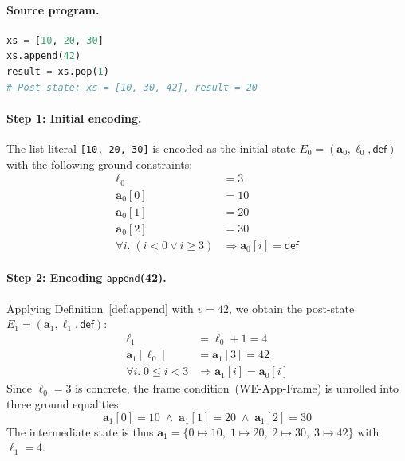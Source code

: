 \documentclass[11pt]{article}
\newcommand{\arrvar}[1]{\mathbf{a}_{#1}}
\newcommand{\lenvar}[1]{\ell_{#1}}
\newcommand{\defval}{\mathsf{def}}
\newcommand{\idx}{i}
\newcommand{\MutApp}{\ensuremath{\mathsf{append}}}
\begin{document}
\paragraph{Source program.}
\begin{lstlisting}[language=Python, caption={Source program for the worked example: append followed by pop.}]
xs = [10, 20, 30]
xs.append(42)
result = xs.pop(1)
# Post-state: xs = [10, 30, 42], result = 20
\end{lstlisting}

\paragraph{Step 1: Initial encoding.}
The list literal \lstinline[style=jugeo-python]{[10, 20, 30]} is encoded as
the initial state $E_0 = (\arrvar{0}, \lenvar{0}, \defval)$ with the
following ground constraints:
\begin{align}
  \lenvar{0} &= 3 \tag{Init-Len}\\
  \arrvar{0}[0] &= 10 \tag{Init-Elem-A}\\
  \arrvar{0}[1] &= 20 \tag{Init-Elem-B}\\
  \arrvar{0}[2] &= 30 \tag{Init-Elem-C}\\
  \forall \idx.\; (\idx < 0 \vee \idx \geq 3)
    &\Rightarrow \arrvar{0}[\idx] = \defval \tag{Init-OOB}
\end{align}

\paragraph{Step 2: Encoding \MutApp(42).}
Applying Definition~\ref{def:append} with $v = 42$, we obtain the post-state
$E_1 = (\arrvar{1}, \lenvar{1}, \defval)$:
\begin{align}
  \lenvar{1} &= \lenvar{0} + 1 = 4 \tag{WE-App-Len}\\
  \arrvar{1}[\lenvar{0}] &= \arrvar{1}[3] = 42 \tag{WE-App-New}\\
  \forall \idx.\; 0 \leq \idx < 3
    &\Rightarrow \arrvar{1}[\idx] = \arrvar{0}[\idx] \tag{WE-App-Frame}
\end{align}
Since $\lenvar{0} = 3$ is concrete, the frame condition~(WE-App-Frame) is
unrolled into three ground equalities:
\[
  \arrvar{1}[0] = 10 \;\wedge\;
  \arrvar{1}[1] = 20 \;\wedge\;
  \arrvar{1}[2] = 30
\]
The intermediate state is thus
$\arrvar{1} = \{0 \mapsto 10,\; 1 \mapsto 20,\; 2 \mapsto 30,\;
3 \mapsto 42\}$ with $\lenvar{1} = 4$.
\end{document}
